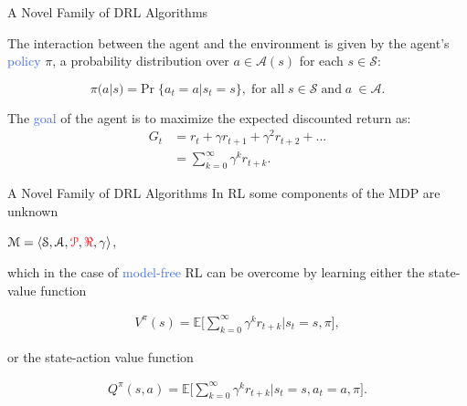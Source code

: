 \documentclass{beamer}
\begin{document}
\begin{frame}{A Novel Family of DRL Algorithms}	
	\bigskip

	The interaction between the agent and the environment is given by the agent's \textcolor{RoyalBlue}{policy} $\pi$, a probability distribution over $a \in \mathcal{A}(s)$ for each $s \in \mathcal{S}$:

	\begin{equation*}
	\pi(a|s) = \text{Pr}\; \{a_t = a | s_t = s\}, \; \text{for all}\; s \in \mathcal{S}\; \text{and}\; a\ \in \mathcal{A}.
	\end{equation*}

	\bigskip

	The \textcolor{RoyalBlue}{goal} of the agent is to maximize the expected discounted return as:
	\begin{equation*}
		\begin{split}
			G_t & = r_t+\gamma r_{t+1} + \gamma^{2} r_{t+2} + ... \\
	    			& = \sum_{k=0}^{\infty}\gamma^{k} r_{t+k}.
		\end{split}
		\label{eq:discounted_return}
	\end{equation*}

\end{frame}


\begin{frame}{A Novel Family of DRL Algorithms}	
	\bigskip
	In RL some components of the MDP are unknown 
	\begin{center}
		$\mathcal{M}=\langle\mathcal{S}, \mathcal{A}, \textcolor{red}{\mathcal{P}}, \textcolor{red}{\Re}, \gamma\rangle$,
	\end{center}
	
	which in the case of \textcolor{RoyalBlue}{model-free} RL can be overcome by learning either the state-value function

	\begin{align*}
    		V^{\pi}(s)=\mathds{E}\bigg[\sum_{k=0}^{\infty}\gamma^{k}r_{t+k}\bigg| s_t = s, \pi \bigg],
	\end{align*}

	or the state-action value function

	\begin{align*}
     		Q^{\pi}(s,a)=\mathds{E}\bigg[\sum_{k=0}^{\infty}\gamma^{k}r_{t+k} \bigg| s_t = s, a_t=a, \pi\bigg].
	\end{align*}
\end{frame}
\end{document}
